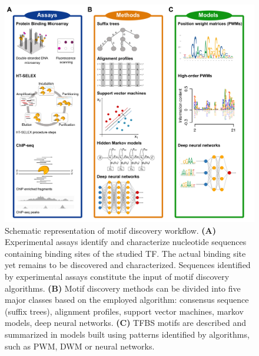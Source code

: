\documentclass[a4paper, titlepage, openright]{book}
\begin{document}
\begin{figure}
	\centering
	\includegraphics[width=\textwidth]{figures/Fig1.png}
	\caption[Schematic representation of motif discovery workflow.]{Schematic representation of motif discovery workflow. \textbf{(A)} Experimental assays identify and characterize nucleotide sequences containing binding sites of the studied TF. The actual binding site yet remains to be discovered and characterized. Sequences identified by experimental assays constitute the input of motif discovery algorithms. \textbf{(B)} Motif discovery methods can be divided into five major classes based on the employed algorithm: consensus sequence (suffix
trees), alignment profiles, support vector machines, markov models, deep neural networks. \textbf{(C)} TFBS motifs are described and summarized in models built using patterns identified by algorithms, such as PWM, DWM or neural networks.}
	\label{fig:md}
\end{figure} 
\end{document}
